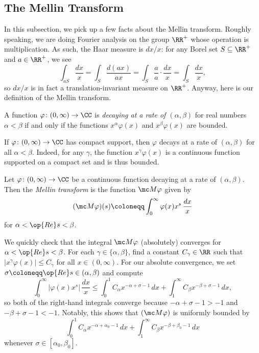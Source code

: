 \documentclass[../notes.tex]{subfiles}
\begin{document}
\subsection{The Mellin Transform}
In this subsection, we pick up a few facts about the Mellin transform. Roughly speaking, we are doing Fourier analysis on the group $\RR^+$ whose operation is multiplication. As such, the Haar measure is $dx/x$: for any Borel set $S\subseteq\RR^+$ and $a\in\RR^+$, we see
\[\int_{aS}\frac{dx}x=\int_S\frac{d(ax)}{ax}=\int_S\frac aa\cdot\frac{dx}x=\int_S\frac{dx}x,\]
so $dx/x$ is in fact a translation-invariant measure on $\RR^+$. Anyway, here is our definition of the Mellin transform.
\begin{definition}[decaying]
	A function $\varphi\colon(0,\infty)\to\CC$ is \textit{decaying at a rate of $(\alpha,\beta)$} for real numbers $\alpha<\beta$ if and only if the functions $x^\alpha\varphi(x)$ and $x^\beta\varphi(x)$ are bounded.
\end{definition}
\begin{example} \label{ex:compact-support-decays}
	If $\varphi\colon(0,\infty)\to\CC$ has compact support, then $\varphi$ decays at a rate of $(\alpha,\beta)$ for all $\alpha<\beta$. Indeed, for any $\gamma$, the function $x^\gamma\varphi(x)$ is a continuous function supported on a compact set and is thus bounded.
\end{example}
\begin{definition}
	Let $\varphi\colon(0,\infty)\to\CC$ be a continuous function decaying at  a rate of $(\alpha,\beta)$. Then the \textit{Mellin transform} is the function $\mc M\varphi$ given by
	\[(\mc M\varphi)(s)\coloneqq\int_0^\infty\varphi(x)x^s\,\frac{dx}x\]
	for $\alpha<\op{Re}s<\beta$.
\end{definition}
\begin{remark} \label{rem:bound-mellin}
	We quickly check that the integral $\mc M\varphi$ (absolutely) converges for $\alpha<\op{Re}s<\beta$. For each $\gamma\in\{\alpha,\beta\}$, find a constant $C_\gamma\in\RR$ such that $\left|x^\gamma\varphi(x)\right|\le C_\gamma$ for all $x\in(0,\infty)$. For our absolute convergence, we set $\sigma\coloneqq\op{Re}s\in(\alpha,\beta)$ and compute
	\[\int_0^\infty\left|\varphi(x)x^s\right|\,\frac{dx}x\le \int_0^1C_\alpha x^{-\alpha+\sigma-1}\,dx+\int_1^\infty C_\beta x^{-\beta+\sigma-1}\,dx,\]
	so both of the right-hand integrals converge because $-\alpha+\sigma-1>-1$ and $-\beta+\sigma-1<-1$. Notably, this shows that $(\mc M\varphi)$ is uniformly bounded by
	\[\int_0^1C_\alpha x^{-\alpha+\alpha_0-1}\,dx+\int_1^\infty C_\beta x^{-\beta+\beta_0-1}\,dx\]
	whenever $\sigma\in[\alpha_0,\beta_0]$.
\end{remark}
\end{document}
